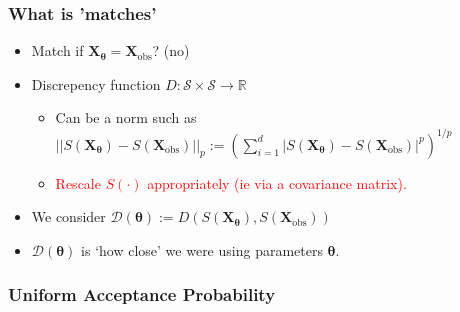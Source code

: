 \documentclass{beamer}
\begin{document}
\begin{frame}
    \frametitle{What is 'matches'}
    \begin{itemize}
        \item Match if $\mathbf{X}_{\bm{\theta}} = \mathbf{X}_\text{obs}$? (no)
        \item <2-> Discrepency function $D:\mathcal{S}\times \mathcal{S} \to \mathbb{R}$ \begin{itemize}
                  \item Can be a norm such as $||S(\mathbf{X}_{\bm{\theta}}) - S(\mathbf{X}_\text{obs})||_p:=(\sum_{i = 1}^d|S(\mathbf{X}_{\bm{\theta}}) - S(\mathbf{X}_\text{obs})|^p)^{1/p}$
                  \item <3-> \textcolor{red}{Rescale $S(\cdot)$ appropriately (ie via a covariance matrix).}
              \end{itemize}
        \item <4-> We consider $\mathcal{D}(\bm{\theta}) := D(S(\mathbf{X}_{\bm{\theta}}), S(\mathbf{X}_\text{obs}))$
        \item <5-> $\mathcal{D}(\bm{\theta})$ is `how close' we were using parameters $\bm\theta.$
    \end{itemize}
\end{frame}

\begin{frame}
    \frametitle{Uniform Acceptance Probability}
    \begin{figure}
        \centering
    \end{figure}
\end{frame}
\end{document}
